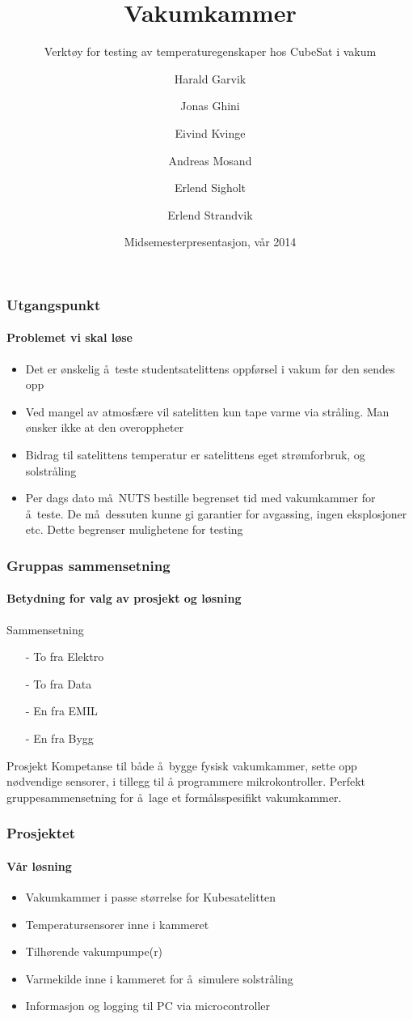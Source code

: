 \documentclass{beamer}
\title[Vakumkammer] %
{Vakumkammer}
\subtitle{Verkt\o y for testing av temperaturegenskaper hos CubeSat i vakum}
\author[Gruppe 1, TFE4850] %
{Harald Garvik  \and Jonas Ghini \and Eivind Kvinge \\ \and Andreas Mosand \and Erlend Sigholt \and Erlend Strandvik}
\date[2014] %
{Midsemesterpresentasjon, v\aa r 2014}
\begin{document}
  \frame{\titlepage}
  \begin{frame}
    \frametitle{Utgangspunkt}
    \framesubtitle{Problemet vi skal l\o se}
    \begin{itemize}%
    	\item Det er \o nskelig \aa\ teste studentsatelittens oppf\o rsel i vakum f\o r den sendes opp
    	\item Ved mangel av atmosf\ae re vil satelitten kun tape varme via str\aa ling. Man \o nsker ikke at den overoppheter
    	\item Bidrag til satelittens temperatur er satelittens eget str\o mforbruk, og solstr\aa ling
    	\item Per dags dato m\aa\ NUTS bestille begrenset tid med vakumkammer for \aa\ teste. De m\aa\ dessuten kunne gi garantier for avgassing, ingen eksplosjoner etc. Dette begrenser mulighetene for testing 
    \end{itemize}
  \end{frame}
  \begin{frame}
    \frametitle{Gruppas sammensetning}
    \framesubtitle{Betydning for valg av prosjekt og l\o sning}
    		\begin{block}{Sammensetning}
    		\begin{itemize}
    			\item[-] To fra Elektro
    			\item[-] To fra Data
    			\item[-] En fra EMIL
    			\item[-] En fra Bygg
    		\end{itemize}
    		\end{block}
    	\pause
    		\begin{block}{Prosjekt}
    		Kompetanse til b\aa de \aa\ bygge fysisk vakumkammer, sette opp
    		n\o dvendige sensorer, i tillegg til å programmere mikrokontroller.
    		\newline
    		\newline
    		Perfekt gruppesammensetning for \aa\ lage et form\aa lsspesifikt vakumkammer.
    		\end{block}
  \end{frame}
  \begin{frame}
    \frametitle{Prosjektet}
    \framesubtitle{V\aa r l\o sning}
    \begin{itemize}
    	\item Vakumkammer i passe st\o rrelse for Kubesatelitten
    	\item Temperatursensorer inne i kammeret
    	\item Tilh\o rende vakumpumpe(r)
    	\item Varmekilde inne i kammeret for \aa\ simulere solstr\aa ling
    	\item Informasjon og logging til PC via microcontroller
    \end{itemize}
  \end{frame}
\end{document}

